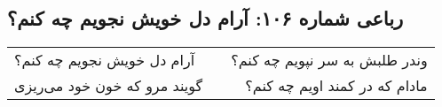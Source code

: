 \begin{center}
\section*{رباعی شماره ۱۰۶: آرام دل خویش نجویم چه کنم؟}
\label{sec:106}
\begin{longtable}{l p{0.5cm} r}
آرام دل خویش نجویم چه کنم؟
&&
وندر طلبش به سر نپویم چه کنم؟
\\
گویند مرو که خون خود می‌ریزی
&&
مادام که در کمند اویم چه کنم؟
\\
\end{longtable}
\end{center}
